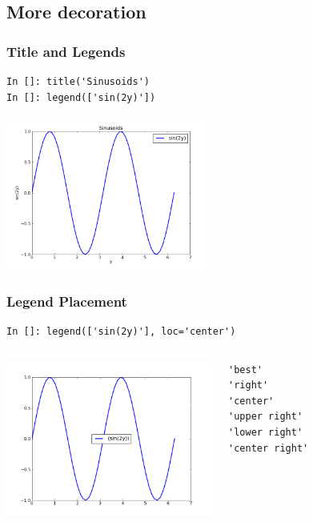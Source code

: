 \documentclass[14pt,compress]{beamer}
\newcounter{time}
\newcommand{\inctime}[1]{\addtocounter{time}{#1}{\tiny \thetime\ m}}
\begin{document}
\subsection{More decoration}
\begin{frame}[fragile]
\frametitle{Title and Legends}
\vspace*{-0.15in}
\begin{lstlisting}
In []: title('Sinusoids')
In []: legend(['sin(2y)'])
\end{lstlisting}
  \vspace*{-0.1in}
  \begin{center}
  \includegraphics[height=2in, interpolate=true]{data/legend}
  \end{center}
\end{frame}

\begin{frame}[fragile]
\frametitle{Legend Placement}
\begin{block}{}
    \small
\begin{lstlisting}
In []: legend(['sin(2y)'], loc='center')
\end{lstlisting}
\end{block}

\begin{columns}
 \includegraphics[height=2in, interpolate=true]{data/position}
\vspace{-0.2in}
\begin{lstlisting}
'best'
'right'
'center'
'upper right'
'lower right'
'center right'
\end{lstlisting}
\end{columns}
\inctime{15}
\end{frame}
\end{document}
